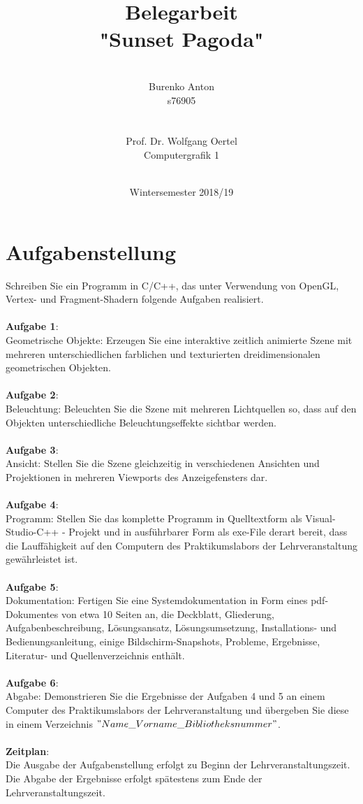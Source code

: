 \documentclass[12pt]{article}
\author{\\ Burenko Anton \\ s76905 \\ \\ \\ Prof. Dr. Wolfgang Oertel \\ 
Computergrafik 1 \\ \\
}
\date{Wintersemester 2018/19}
\title{Belegarbeit\\ "Sunset Pagoda"}
\begin{document}

\maketitle

\pagebreak

\tableofcontents

\pagebreak

\section{Aufgabenstellung}
Schreiben Sie ein Programm in C/C++, das unter Verwendung von OpenGL, Vertex- und
Fragment-Shadern folgende Aufgaben realisiert. \\ \\
\textbf{Aufgabe 1}: \\
Geometrische Objekte: Erzeugen Sie eine interaktive zeitlich animierte Szene mit mehreren
unterschiedlichen farblichen und texturierten dreidimensionalen geometrischen Objekten. \\ \\
\textbf{Aufgabe 2}: \\
Beleuchtung: Beleuchten Sie die Szene mit mehreren Lichtquellen so, dass auf den Objekten
unterschiedliche Beleuchtungseffekte sichtbar werden. \\ \\
\textbf{Aufgabe 3}: \\
Ansicht: Stellen Sie die Szene gleichzeitig in verschiedenen Ansichten und Projektionen in
mehreren Viewports des Anzeigefensters dar. \\ \\
\textbf{Aufgabe 4}: \\
Programm: Stellen Sie das komplette Programm in Quelltextform als Visual-Studio-C++ -
Projekt und in ausführbarer Form als exe-File derart bereit, dass die Lauffähigkeit auf den
Computern des Praktikumslabors der Lehrveranstaltung gewährleistet ist. \\ \\
\textbf{Aufgabe 5}: \\
Dokumentation: Fertigen Sie eine Systemdokumentation in Form eines pdf-Dokumentes von
etwa 10 Seiten an, die Deckblatt, Gliederung, Aufgabenbeschreibung, Lösungsansatz,
Lösungsumsetzung, Installations- und Bedienungsanleitung, einige Bildschirm-Snapshots,
Probleme, Ergebnisse, Literatur- und Quellenverzeichnis enthält. \\ \\
\textbf{Aufgabe 6}: \\
Abgabe: Demonstrieren Sie die Ergebnisse der Aufgaben 4 und 5 an einem Computer des
Praktikumslabors der Lehrveranstaltung und übergeben Sie diese in einem Verzeichnis
$"Name\_Vorname\_Bibliotheksnummer"$. \\ \\
\textbf{Zeitplan}: \\
Die Ausgabe der Aufgabenstellung erfolgt zu Beginn der Lehrveranstaltungszeit. Die Abgabe
der Ergebnisse erfolgt spätestens zum Ende der Lehrveranstaltungszeit. \\
\end{document}
